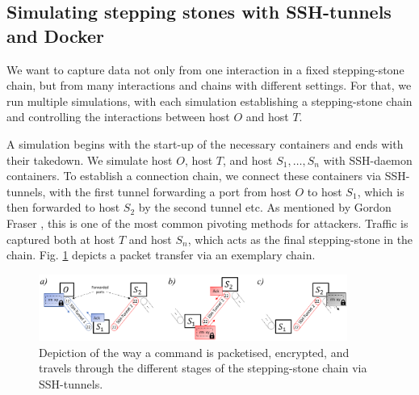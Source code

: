 \documentclass[runningheads,11pt]{llncs}\usepackage[]{graphicx}\usepackage[]{color}
\begin{document}
\subsection{Simulating stepping stones with SSH-tunnels and Docker}\label{Sec:Setup}

We want to capture data not only from one interaction in a fixed stepping-stone chain, but from many interactions and chains with different settings. For that, we run multiple simulations, with each simulation establishing a stepping-stone chain and controlling the interactions between host $O$ and host $T$. %

A simulation begins with the start-up of the necessary containers and ends with their takedown. We simulate host $O$, host $T$, and host $S_1,\dots,S_n$ with SSH-daemon containers. To establish a connection chain, we connect these containers via SSH-tunnels, with the first tunnel forwarding a port from host $O$ to host $S_1$, which is then forwarded to host $S_2$ by the second tunnel etc. As mentioned by Gordon Fraser \cite{pivoting2015}, this is one of the most common pivoting methods for attackers. Traffic is captured both at host $T$ and host $S_n$, which acts as the final stepping-stone in the chain.
Fig. \ref{Fig:Packetway} depicts a packet transfer via an exemplary chain. 


\begin{figure}
\centering
\includegraphics[width=0.9\textwidth]{images/Packetway_2.png}
\caption{Depiction of the way a command is packetised, encrypted, and travels through the different stages of the stepping-stone chain via SSH-tunnels.}\label{Fig:Packetway}
\vspace{-0.4cm}
\end{figure}








\vspace{-0.6cm}
\end{document}
